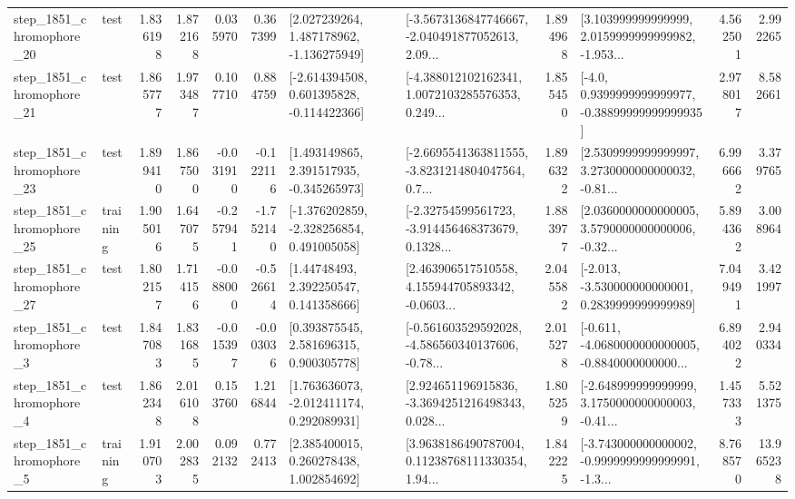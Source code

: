 \begin{tabular}{llrrrrllrlrr}
 step\_1851\_chromophore\_20 &      test &      1.836198 &    1.872168 &      0.035970 &  0.367399 &    [2.027239264, 1.487178962, -1.136275949] &  [-3.5673136847746667, -2.040491877052613, 2.09... &       1.894968 &  [3.103999999999999, 2.0159999999999982, -1.953... &            4.562501 &          2.992265 \\
 step\_1851\_chromophore\_21 &      test &      1.865777 &    1.973487 &      0.107710 &  0.884759 &   [-2.614394508, 0.601395828, -0.114422366] &  [-4.388012102162341, 1.0072103285576353, 0.249... &       1.855450 &   [-4.0, 0.9399999999999977, -0.38899999999999935] &            2.978017 &          8.582661 \\
 step\_1851\_chromophore\_23 &      test &      1.899410 &    1.867500 &     -0.031910 & -0.122116 &    [1.493149865, 2.391517935, -0.345265973] &  [-2.6695541363811555, -3.8231214804047564, 0.7... &       1.896322 &  [2.5309999999999997, 3.2730000000000032, -0.81... &            6.996662 &          3.379765 \\
 step\_1851\_chromophore\_25 &  training &      1.905016 &    1.647075 &     -0.257941 & -1.752140 &   [-1.376202859, -2.328256854, 0.491005058] &  [-2.32754599561723, -3.914456468373679, 0.1328... &       1.883977 &  [2.0360000000000005, 3.5790000000000006, -0.32... &            5.894362 &          3.008964 \\
 step\_1851\_chromophore\_27 &      test &      1.802157 &    1.714156 &     -0.088000 & -0.526614 &      [1.44748493, 2.392250547, 0.141358666] &  [2.463906517510558, 4.155944705893342, -0.0603... &       2.045582 &   [-2.013, -3.530000000000001, 0.2839999999999989] &            7.049491 &          3.421997 \\
  step\_1851\_chromophore\_3 &      test &      1.847083 &    1.831685 &     -0.015397 & -0.003036 &     [0.393875545, 2.581696315, 0.900305778] &  [-0.561603529592028, -4.586560340137606, -0.78... &       2.015278 &  [-0.611, -4.0680000000000005, -0.8840000000000... &            6.894022 &          2.940334 \\
  step\_1851\_chromophore\_4 &      test &      1.862348 &    2.016108 &      0.153760 &  1.216844 &    [1.763636073, -2.012411174, 0.292089931] &  [2.924651196915836, -3.3694251216498343, 0.028... &       1.805259 &  [-2.648999999999999, 3.1750000000000003, -0.41... &            1.457333 &          5.521375 \\
  step\_1851\_chromophore\_5 &  training &      1.910703 &    2.002835 &      0.092132 &  0.772413 &     [2.385400015, 0.260278438, 1.002854692] &  [3.9638186490787004, 0.11238768111330354, 1.94... &       1.842225 &  [-3.743000000000002, -0.9999999999999991, -1.3... &            8.768570 &         13.965238 \\

\end{tabular}
